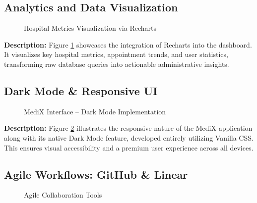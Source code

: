 \documentclass[12pt,a4paper]{article}
\begin{document}
\subsection{Analytics and Data Visualization}

\begin{figure}[H]
    \centering
    \caption{Hospital Metrics Visualization via Recharts}
    \label{fig:analytics}
\end{figure}

\noindent\textbf{Description:} Figure \ref{fig:analytics} showcases the integration of Recharts into the dashboard. It visualizes key hospital metrics, appointment trends, and user statistics, transforming raw database queries into actionable administrative insights.

\subsection{Dark Mode \& Responsive UI}

\begin{figure}[H]
    \centering
    \caption{MediX Interface -- Dark Mode Implementation}
    \label{fig:dark_mode}
\end{figure}

\noindent\textbf{Description:} Figure \ref{fig:dark_mode} illustrates the responsive nature of the MediX application along with its native Dark Mode feature, developed entirely utilizing Vanilla CSS. This ensures visual accessibility and a premium user experience across all devices.

\subsection{Agile Workflows: GitHub \& Linear}

\begin{figure}[H]
    \centering
    \caption{Agile Collaboration Tools}
    \label{fig:agile_tools}
\end{figure}
\end{document}

